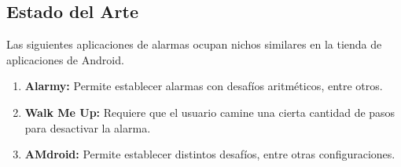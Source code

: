 \subsection{Estado del Arte}
	Las siguientes aplicaciones de alarmas ocupan nichos similares en la tienda de aplicaciones de Android.

	\begin{enumerate}
		\item[] \textbf{Alarmy:} Permite establecer alarmas con desafíos aritméticos, entre otros.
		\item[] \textbf{Walk Me Up:} Requiere que el usuario camine una cierta cantidad de pasos para desactivar la alarma.
		\item[] \textbf{AMdroid:} Permite establecer distintos desafíos, entre otras configuraciones.
	\end{enumerate}
